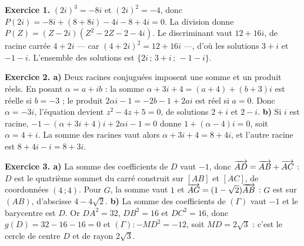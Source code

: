 \begin{corrige}
\textbf{Exercice 1.} $(2i)^{3} = -8i$ et $(2i)^{2} = -4$, donc
$P(2i) = -8i+(8+8i)-4i-8+4i = 0$. La division donne
$P(Z) = (Z-2i)\left(Z^{2}-2Z-2-4i\right)$. Le discriminant vaut $12+16i$, de
racine carrée $4+2i$ — car $(4+2i)^{2} = 12+16i$ —, d'où les solutions
$3+i$ et $-1-i$. L'ensemble des solutions est
$\{2i\,;\,3+i\,;\,-1-i\}$.

\textbf{Exercice 2. a)} Deux racines conjuguées imposent une somme et un produit
réels. En posant $\alpha = a+ib$ : la somme $\alpha+3i+4 = (a+4)+(b+3)i$ est
réelle si $b = -3$ ; le produit $2\alpha i-1 = -2b-1+2ai$ est réel si
$a = 0$. Donc $\alpha = -3i$, l'équation devient $z^{2}-4z+5 = 0$, de
solutions $2+i$ et $2-i$.
\textbf{b)} Si $i$ est racine, $-1-(\alpha+3i+4)i+2\alpha i-1 = 0$ donne
$1+(\alpha-4)i = 0$, soit $\alpha = 4+i$. La somme des racines vaut alors
$\alpha+3i+4 = 8+4i$, et l'autre racine est $8+4i-i = 8+3i$.

\textbf{Exercice 3. a)} La somme des coefficients de $D$ vaut $-1$, donc
$\overrightarrow{AD} = \overrightarrow{AB}+\overrightarrow{AC}$ : $D$ est le quatrième sommet du carré
construit sur $[AB]$ et $[AC]$, de coordonnées $(4\,;4)$. Pour $G$, la somme
vaut $1$ et $\overrightarrow{AG} = (1-\sqrt2)\overrightarrow{AB}$ : $G$ est sur $(AB)$, d'abscisse
$4-4\sqrt2$.
\textbf{b)} La somme des coefficients de $(\Gamma)$ vaut $-1$ et le barycentre
est $D$. Or $DA^{2} = 32$, $DB^{2} = 16$ et $DC^{2} = 16$, donc
$g(D) = 32-16-16 = 0$ et $(\Gamma) : -MD^{2} = -12$, soit $MD = 2\sqrt3$ :
c'est le cercle de centre $D$ et de rayon $2\sqrt3$.

\end{corrige}
